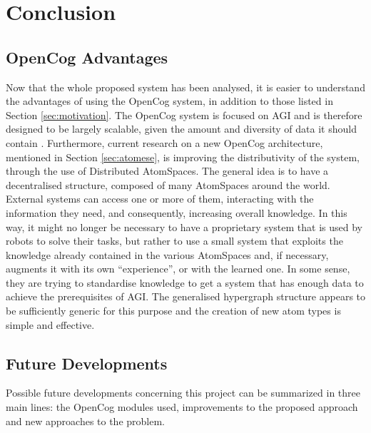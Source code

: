 \chapter{Conclusion} \label{cha:conclusion}

\section{OpenCog Advantages}\label{sec:opencog_advantages}

Now that the whole proposed system has been analysed, it is easier to understand the advantages of using the OpenCog system, in addition to those listed in Section \ref{sec:motivation}.
The OpenCog system is focused on AGI and is therefore designed to be largely scalable, given the amount and diversity of data it should contain \cite{net_scalab_2021}.
Furthermore, current research on a new OpenCog architecture, mentioned in Section \ref{sec:atomese}, is improving the distributivity of the system, through the use of Distributed AtomSpaces. The general idea is to have a decentralised structure, composed of many AtomSpaces around the world. External systems can access one or more of them, interacting with the information they need, and consequently, increasing overall knowledge. In this way, it might no longer be necessary to have a proprietary system that is used by robots to solve their tasks, but rather to use a small system that exploits the knowledge already contained in the various AtomSpaces and, if necessary, augments it with its own \enquote{experience}, or with the learned one. In some sense, they are trying to standardise knowledge to get a system that has enough data to achieve the prerequisites of AGI.
The generalised hypergraph structure appears to be sufficiently generic for this purpose and the creation of new atom types is simple and effective. 



\section{Future Developments}\label{sec:future_devel}

Possible future developments concerning this project can be summarized in three main lines: the OpenCog modules used, improvements to the proposed approach and new approaches to the problem.

